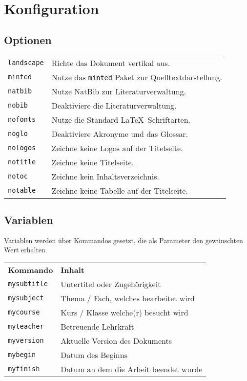 
\section{Konfiguration}
\subsection{Optionen}
\begin{tabularx}{\textwidth}{l X}
{\small \verb|landscape|}    & Richte das Dokument vertikal aus.\\
{\small \verb|minted|}       & Nutze das \texttt{minted} Paket zur Quelltextdarstellung.\\
{\small \verb|natbib|}       & Nutze NatBib zur Literaturverwaltung.\\
{\small \verb|nobib|}        & Deaktiviere die Literaturverwaltung.\\
{\small \verb|nofonts|}      & Nutze die Standard \LaTeX ~Schriftarten.\\
{\small \verb|noglo|}        & Deaktiviere Akronyme und das Glossar.\\
{\small \verb|nologos|}      & Zeichne keine Logos auf der Titelseite.\\
{\small \verb|notitle|}      & Zeichne keine Titelseite.\\
{\small \verb|notoc|}        & Zeichne kein Inhaltsverzeichnis.\\
{\small \verb|notable|}      & Zeichne keine Tabelle auf der Titelseite.
\end{tabularx}

\subsection{Variablen}
Variablen werden über Kommandos gesetzt, die als Parameter den gewünschten Wert erhalten.
\begin{center}
    \ifminted   {}
    \else       {}\fi
\end{center}

\begin{tabular}{l l}
\textbf{Kommando} & \textbf{Inhalt}\\

{\small \verb|mysubtitle|} 	& Untertitel oder Zugehörigkeit\\
{\small \verb|mysubject|} 	& Thema / Fach, welches bearbeitet wird\\
{\small \verb|mycourse|} 	& Kurs / Klasse welche(r) besucht wird\\
{\small \verb|myteacher|} 	& Betreuende Lehrkraft\\
{\small \verb|myversion|} 	& Aktuelle Version des Dokuments\\
{\small \verb|mybegin|} 	& Datum des Beginns\\
{\small \verb|myfinish|} 	& Datum an dem die Arbeit beendet wurde
\end{tabular}

